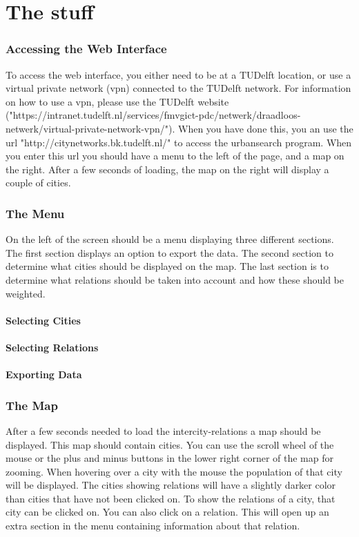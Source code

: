 \chapter{The stuff}

\subsection{Accessing the Web Interface}
To access the web interface, you either need to be at a TUDelft location, or use a virtual private network (vpn) connected to the TUDelft network. For information on how to use a vpn, please use the TUDelft website ("https://intranet.tudelft.nl/services/fmvgict-pdc/netwerk/draadloos-netwerk/virtual-private-network-vpn/"). When you have done this, you an use the url "http://citynetworks.bk.tudelft.nl/" to access the urbansearch program. When you enter this url you should have a menu to the left of the page, and a map on the right. After a few seconds of loading, the map on the right will display a couple of cities. 


\subsection{The Menu}
On the left of the screen should be a menu displaying three different sections. The first section displays an option to export the data. The second section to determine what cities should be displayed on the map. The last section is to determine what relations should be taken into account and how these should be weighted.

\subsubsection{Selecting Cities}
\subsubsection{Selecting Relations}
\subsubsection{Exporting Data}

\subsection{The Map}
After a few seconds needed to load the intercity-relations a map should be displayed. This map should contain cities. You can use the scroll wheel of the mouse or the plus and minus buttons in the lower right corner of the map for zooming. When hovering over a city with the mouse the population of that city will be displayed. The cities showing relations will have a slightly darker color than cities that have not been clicked on. To show the relations of a city, that city can be clicked on. You can also click on a relation. This will open up an extra section in the menu containing information about that relation.

